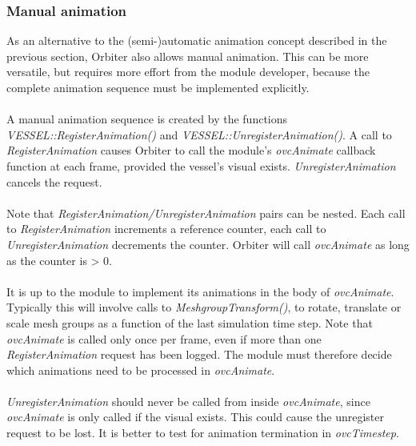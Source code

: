 \documentclass[Orbiter Developer Manual.tex]{subfiles}
\begin{document}
\subsubsection{Manual animation}
As an alternative to the (semi-)automatic animation concept described in the previous section, Orbiter also allows manual animation. This can be more versatile, but requires more effort from the module developer, because the complete animation sequence must be implemented explicitly.\\
\\
A manual animation sequence is created by the functions \textit{VESSEL::RegisterAnimation()} and \textit{VESSEL::UnregisterAnimation()}. A call to \textit{RegisterAnimation} causes Orbiter to call the module’s \textit{ovcAnimate} callback function at each frame, provided the vessel’s visual exists. \textit{UnregisterAnimation} cancels the request.\\
\\
Note that \textit{RegisterAnimation/UnregisterAnimation} pairs can be nested. Each call to \textit{RegisterAnimation} increments a reference counter, each call to \textit{UnregisterAnimation} decrements the counter. Orbiter will call \textit{ovcAnimate} as long as the counter is > 0.\\
\\
It is up to the module to implement its animations in the body of \textit{ovcAnimate}. Typically this will involve calls to \textit{MeshgroupTransform()}, to rotate, translate or scale mesh groups as a function of the last simulation time step. Note that \textit{ovcAnimate} is called only once per frame, even if more than one \textit{RegisterAnimation} request has been logged. The module must therefore decide which animations need to be processed in \textit{ovcAnimate}.\\
\\
\textit{UnregisterAnimation} should never be called from inside \textit{ovcAnimate}, since \textit{ovcAnimate} is only called if the visual exists. This could cause the unregister request to be lost. It is better to test for animation termination in \textit{ovcTimestep}.
\end{document}
